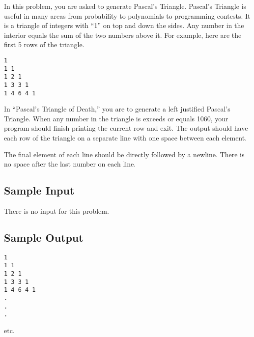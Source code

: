 

In this problem, you are asked to generate Pascal's Triangle. Pascal's Triangle is useful in many
areas from probability to polynomials to programming contests. It is a triangle of integers with
``1'' on top and down the sides. Any number in the interior equals the sum of the two numbers
above it. For example, here are the first 5 rows of the triangle.

\begin{verbatim}
1  
1 1  
1 2 1  
1 3 3 1  
1 4 6 4 1
\end{verbatim}

In ``Pascal's Triangle of Death,'' you are to generate a left justified Pascal's Triangle. When any
number in the triangle is exceeds or equals 1060, your program should finish printing the
current row and exit. The output should have each row of the triangle on a separate line with one
space between each element.

The final element of each line should be directly followed by a
newline. There is no space after the last number on each line.

\subsection*{Sample Input}

There is no input for this problem.

\subsection*{Sample Output}

\begin{verbatim}
1
1 1
1 2 1
1 3 3 1
1 4 6 4 1
.
.
.
\end{verbatim}

etc.
